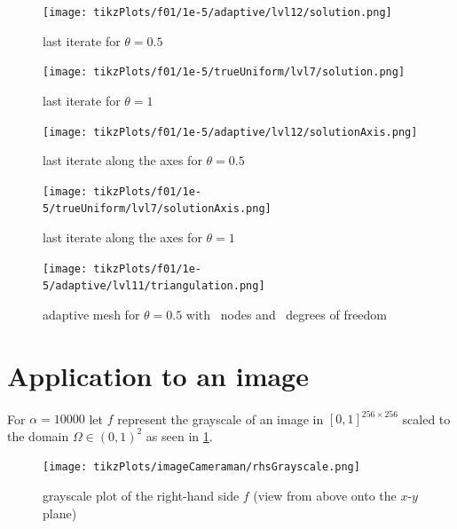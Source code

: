 \documentclass[draft=false,twoside,12pt]{scrreprt}
\begin{document}
\begin{minipage}[t]{0.45\textwidth}
  \begin{figure}[H]
	  \centering
		\texttt{[image: tikzPlots/f01/1e-5/adaptive/lvl12/solution.png]} 
    \caption{last iterate for $\theta = 0.5$}
  \end{figure}
\end{minipage}
\begin{minipage}[t]{0.45\textwidth}
  \begin{figure}[H]
	  \centering
		\texttt{[image: tikzPlots/f01/1e-5/trueUniform/lvl7/solution.png]} 
    \caption{last iterate for $\theta = 1$}
  \end{figure}
\end{minipage}

\begin{minipage}[t]{0.45\textwidth}
  \begin{figure}[H]
	  \centering
		\texttt{[image: tikzPlots/f01/1e-5/adaptive/lvl12/solutionAxis.png]} 
    \caption{last iterate along the axes for $\theta = 0.5$}
  \end{figure}
\end{minipage}
\begin{minipage}[t]{0.45\textwidth}
  \begin{figure}[H]
	  \centering
		\texttt{[image: tikzPlots/f01/1e-5/trueUniform/lvl7/solutionAxis.png]} 
    \caption{last iterate along the axes for $\theta = 1$}
  \end{figure}
\end{minipage}


\begin{figure}[H]
	\centering
  \texttt{[image: tikzPlots/f01/1e-5/adaptive/lvl11/triangulation.png]}
  \caption{adaptive mesh for $\theta = 0.5$ with \nrNodes\ nodes and 
  \nrDof\ degrees of freedom}
\end{figure}


\section{Application to an image}
For $\alpha = 10000$ let $f$ represent the grayscale of an 
image in $[0,1]^{256\times 256}$ scaled to the domain $\Omega\in(0,1)^2$ as
seen in \cref{fig:rhsCameraman}.

\begin{figure}[H]
	\centering
	\texttt{[image: tikzPlots/imageCameraman/rhsGrayscale.png]}
  \caption{grayscale plot of the right-hand side $f$ (view from above onto the
  $x$-$y$ plane)}
  \label{fig:rhsCameraman}
\end{figure}
\end{document}
